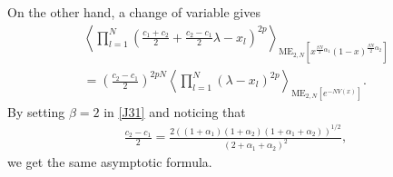 \documentclass[11pt,a4paper]{article}
\numberwithin{equation}{section} %
\theoremstyle{plain}
\theoremstyle{definition}
\numberwithin{prop}{section}
\numberwithin{cor}{section}
\numberwithin{remark}{section}
\begin{document}
\begin{itemize}
    On the other hand, a change of variable gives
    \begin{align}
        \left\langle\prod_{l=1}^{N}\left(\frac{c_1+c_2}{2}+\frac{c_2-c_1}{2}\lambda-x_l\right)^{2p}\right\rangle_{\mathrm{ME}_{2,N}\left[x^{\frac{\beta N}{2}\alpha_1}(1-x)^{\frac{\beta N}{2}\alpha_2}\right]}\\
        =\left(\frac{c_2-c_1}{2}\right)^{2pN}\left\langle\prod_{l=1}^{N}(\lambda-x_l)^{2p}\right\rangle_{\mathrm{ME}_{2,N}[e^{-NV(x)}]}.
    \end{align}
    By setting $\beta=2$ in \eqref{J31} and noticing that 
    \begin{align}
        \frac{c_2-c_1}{2}=\frac{2((1+\alpha_1)(1+\alpha_2)(1+\alpha_1+\alpha_2))^{1/2}}{(2+\alpha_1+\alpha_2)^2},
    \end{align}
    we get the same asymptotic formula.
\end{itemize}
\end{document}
